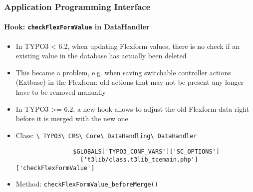 
\begin{frame}[fragile]
	\frametitle{Application Programming Interface}
	\framesubtitle{Hook: \texttt{checkFlexFormValue} in DataHandler}

	\begin{itemize}
		\item In TYPO3 < 6.2, when updating Flexform values, there is no check if an existing value in the database has actually been deleted
		\item This became a problem, e.g. when saving switchable controller actions (Extbase) in the Flexform: old actions that may not be present any longer have to be removed manually

		\item In TYPO3 >= 6.2, a new hook allows to adjust the old Flexform data right before it is merged with the new one
		\item Class:\newline
			\smaller
				\texttt{\textbackslash
					TYPO3\textbackslash
					CMS\textbackslash
					Core\textbackslash
					DataHandling\textbackslash
					DataHandler}\normalsize

			\lstset{
				basicstyle=\smaller\ttfamily
			}

			\begin{lstlisting}
				$GLOBALS['TYPO3_CONF_VARS']['SC_OPTIONS']
				  ['t3lib/class.t3lib_tcemain.php']['checkFlexFormValue']
			\end{lstlisting}

		\item Method:\newline
			\smaller
				\texttt{checkFlexFormValue\_beforeMerge()}

	\end{itemize}

\end{frame}


